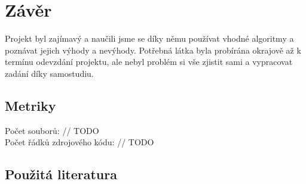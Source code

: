 \documentclass[a4paper,11pt]{article}
\begin{document}
\section{Závěr}
Projekt byl zajímavý a naučili jsme se díky němu používat vhodné algoritmy a poznávat jejich výhody a nevýhody. Potřebná látka byla probírána okrajově až k termínu odevzdání projektu, ale nebyl problém si vše zjistit sami a vypracovat zadání díky samostudiu.

\subsection{Metriky}
Počet souborů: // TODO \\
Počet řádků zdrojového kódu: // TODO

\subsection{Použitá literatura}



\nocite{*}




\newpage
\thispagestyle{empty}
\end{document}
